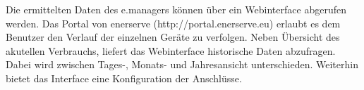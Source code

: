  \noindent
 Die ermittelten Daten des e.managers können über ein Webinterface abgerufen werden. Das Portal von enerserve (http://portal.enerserve.eu) erlaubt es dem Benutzer den Verlauf der einzelnen Geräte zu verfolgen. Neben Übersicht des akutellen Verbrauchs, liefert das Webinterface historische Daten abzufragen. Dabei wird zwischen Tages-, Monats- und Jahresansicht unterschieden. Weiterhin bietet das Interface eine Konfiguration der Anschlüsse.